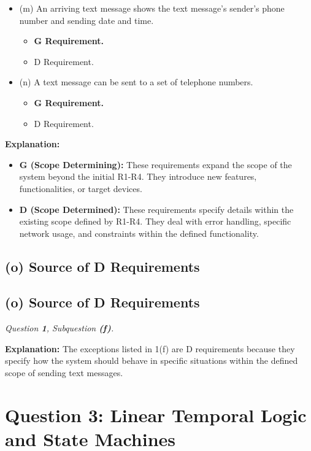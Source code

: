 \documentclass{article}
\begin{document}
\begin{itemize}
\begin{itemize}
    \end{itemize}
    \item (m) An arriving text message shows the text message's sender's phone number and sending date and time.
    \begin{itemize}
        \item \textbf{G Requirement.} \checkmark
        \item D Requirement.
    \end{itemize}
        \item (n) A text message can be sent to a set of telephone numbers.
    \begin{itemize}
        \item \textbf{G Requirement.} \checkmark
        \item D Requirement.
    \end{itemize}
\end{itemize}

\textbf{Explanation:}
\begin{itemize}
    \item \textbf{G (Scope Determining):} These requirements expand the scope of the system beyond the initial R1-R4. They introduce new features, functionalities, or target devices.
    \item \textbf{D (Scope Determined):} These requirements specify details within the existing scope defined by R1-R4. They deal with error handling, specific network usage, and constraints within the defined functionality.
\end{itemize}

\subsection*{(o) Source of D Requirements}

\subsection*{(o) Source of D Requirements}

\textit{Question \textbf{1}, Subquestion \textbf{(f)}.}

\textbf{Explanation:} The exceptions listed in 1(f) are D requirements because they specify how the system should behave in specific situations within the defined scope of sending text messages.

\section*{Question 3: Linear Temporal Logic and State Machines}
\end{document}
